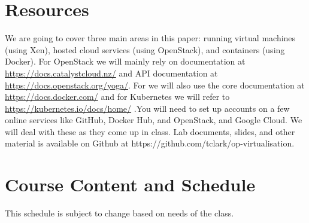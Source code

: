 \documentclass{article}
\begin{document}
\section*{Resources}
We are going to cover three main areas in this paper: running virtual machines (using Xen), hosted cloud services (using OpenStack), and containers (using Docker). For OpenStack we will mainly rely on documentation at \url{https://docs.catalystcloud.nz/} and API documentation at \url{https://docs.openstack.org/yoga/}. For we will also use the core documentation at \url{https://docs.docker.com/} and for Kubernetes we will refer to \url{https://kubernetes.io/docs/home/} .You will need to set up accounts on a few online services like GitHub, Docker Hub, and OpenStack, and Google Cloud.  We will deal with these as they come up in class. Lab documents, slides, and other material is available on Github at https://github.com/tclark/op-virtualisation.

\newpage 

\section*{Course Content and Schedule}
This schedule is subject to change based on needs of the class.
\end{document}
